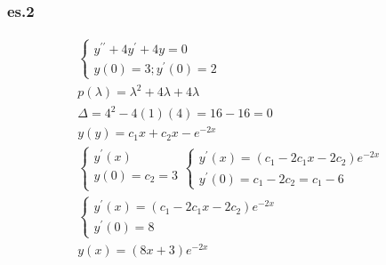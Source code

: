 \documentclass{article}
\begin{document}
\subsubsection{es.2}
\begin{equation*}
	\begin{matrix}
		\begin{cases}
			y^{\prime\prime}+4y^\prime+4y=0\\
			y(0)=3; y^\prime(0)=2
		\end{cases}\\
		p(\lambda)=\lambda^2+4\lambda+4\lambda\\
		\Delta = 4^2-4(1)(4)=16-16=0\\
		y(y)=c_1x+c_2x-e^{-2x}\\
		\begin{cases}
			y^\prime(x)\\
			y(0)=c_2=3\\
		\end{cases}
		\begin{cases}
			y^\prime(x)=(c_1-2c_1x-2c_2)e^{-2x}\\
			y^\prime(0)=c_1-2c_2=c_1-6
		\end{cases}\\
		\begin{cases}
			y^\prime(x)=(c_1-2c_1x-2c_2)e^{-2x}\\
			y^\prime(0)=8
		\end{cases}\\
		y(x)=(8x+3)e^{-2x}
	\end{matrix}
\end{equation*}
\end{document}
